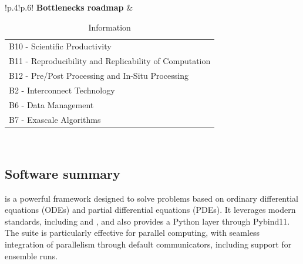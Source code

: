\begin{table}[!ht]
{{\begin{tabular}{!{\color{numpexgray}\vrule}p{.4\textwidth}!{\color{numpexgray}\vrule}p{.6\textwidth}!{\color{numpexgray}\vrule}}
        \textbf{Bottlenecks roadmap} & \begin{tabular}{l}
B10 - Scientific Productivity\\
B11 - Reproducibility and Replicability of Computation\\
B12 - Pre/Post Processing and In-Situ Processing\\
B2 - Interconnect Technology\\
B6 - Data Management\\
B7 - Exascale Algorithms\\
\end{tabular} \\
        \hline
    \end{tabular}
    }}
    \caption{\Feelpp Information}
\end{table}

\subsection{Software summary}
\label{sec:Feelpp:summary}

\Feelpp is a powerful framework designed to solve problems based on ordinary differential equations (ODEs) and partial differential equations (PDEs).
It leverages modern \Cpp{} standards, including  and , and also provides a Python layer through Pybind11.
The suite is particularly effective for parallel computing, with seamless integration of parallelism through default communicators, including support for ensemble runs.



